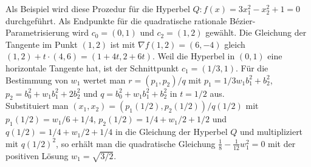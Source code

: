 Als Beispiel wird diese Prozedur für die Hyperbel $Q\colon f(x) = 3x_1^2 - x_2^2 + 1 = 0$
durchgeführt.
Als Endpunkte für die quadratische rationale Bézier-Parametrisierung wird
$c_0 = (0, 1)$ und $c_2 = (1, 2)$ gewählt.
Die Gleichung der Tangente im Punkt $(1, 2)$ ist mit
$\nabla f(1, 2) = (6, -4)$ gleich
$(1, 2) + t \cdot (4, 6) = (1 + 4t, 2 + 6t)$.
Weil die Hyperbel in $(0, 1)$ eine horizontale Tangente hat, ist der Schnittpunkt
$c_1 = (1/3, 1)$.
Für die Bestimmung von $w_1$ wertet man
$r = (p_1, p_2)/q$ mit $p_1 = 1/3 w_1 b_1^2 + b_2^2$, $p_2 = b_0^2 + w_1 b_1^2 + 2 b_2^2$ und
$q = b_0^2 + w_1 b_1^2 + b_2^2$ in $t = 1/2$ aus.\\
Substituiert man $(x_1, x_2) = (p_1(1/2), p_2(1/2))/q(1/2)$ mit
$p_1(1/2) = w_1/6 + 1/4$, $p_2(1/2) = 1/4 + w_1/2 + 1/2$ und $q(1/2) = 1/4 + w_1/2 + 1/4$
in die Gleichung der Hyperbel $Q$ und multipliziert mit $q(1/2)^2$, so erhält man die quadratische
Gleichung $\frac{1}{8} - \frac{1}{12} w_1^2 = 0$ mit der positiven Lösung
$w_1 = \sqrt{3/2}$.

\pagebreak
